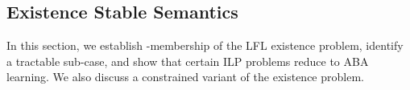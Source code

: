 \documentclass[letterpaper]{article} %
\newcommand{\stb}{\textit{st}}
\newcommand{\asms}{\asm}
\newcommand{\asm}{\ensuremath{\mathcal{A}}}
\newcommand{\setS}{\mathbb{S}}
\newcommand{\contraryAF}[1]{F^{c}_{#1}}
\newcommand{\contraryArgs}[1]{\asm^{c}_{#1}}
\newtheorem{observation}[example]{Observation}
\begin{document}
\subsection{Existence Stable Semantics}\label{sec:stable-existence}



In this section, we establish \NP-membership of the LFL existence problem, identify a tractable sub-case, and show that certain ILP problems reduce to ABA learning. We also discuss a constrained variant of the existence problem. 
\end{document}
